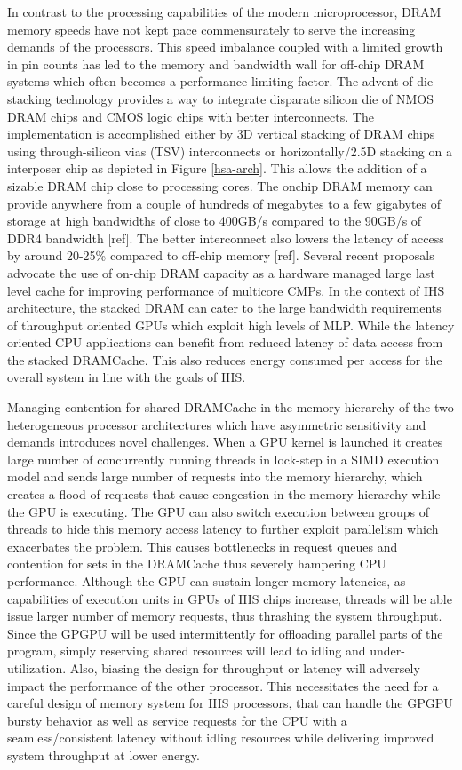 \par In contrast to the processing capabilities of the modern microprocessor, DRAM memory speeds have not kept pace commensurately to serve the increasing demands of the processors. This speed imbalance coupled with a limited growth in pin counts has led to the memory and bandwidth wall \cite{memory-wall,bandwidth-wall} for off-chip DRAM systems which often becomes a performance limiting factor. The advent of die-stacking technology \cite{3d-stacking} provides a way to integrate disparate silicon die of NMOS DRAM chips and CMOS logic chips with better interconnects. The implementation is accomplished either by 3D vertical stacking of DRAM chips using through-silicon vias (TSV) interconnects or horizontally/2.5D stacking on a interposer chip as depicted in Figure \ref{hsa-arch}. This allows the addition of a sizable DRAM chip close to processing cores. The onchip DRAM memory can provide anywhere from a couple of hundreds of megabytes to a few gigabytes of storage at high bandwidths of close to 400GB/s compared to the 90GB/s of DDR4 bandwidth [ref]. The better interconnect also lowers the latency of access by around 20-25\% compared to off-chip memory [ref]. Several recent proposals advocate the use of on-chip DRAM capacity as a hardware managed large last level cache for improving performance of multicore CMPs. In the context of IHS architecture, the stacked DRAM can cater to the large bandwidth requirements of throughput oriented GPUs which exploit high levels of MLP. While the latency oriented CPU applications can benefit from reduced latency of data access from the stacked DRAMCache. This also reduces energy consumed per access for the overall system in line with the goals of IHS.
\par Managing contention for shared DRAMCache in the memory hierarchy of the two heterogeneous processor architectures which have asymmetric sensitivity and demands introduces novel challenges. When a GPU kernel is launched it creates large number of concurrently running threads in lock-step in a SIMD execution model and sends large number of requests into the memory hierarchy, which creates a flood of requests that cause congestion in the memory hierarchy while the GPU is executing. The GPU can also switch execution between groups of threads to hide this memory access latency to further exploit parallelism which exacerbates the problem. This causes bottlenecks in request queues and contention for sets in the DRAMCache thus severely hampering CPU performance. Although the GPU can sustain longer memory latencies, as capabilities of execution units in GPUs of IHS chips increase, threads will be able issue larger number of memory requests, thus thrashing the system throughput. Since the GPGPU will be used intermittently for offloading parallel parts of the program, simply reserving shared resources will lead to idling and under-utilization. Also, biasing the design for throughput or latency will adversely impact the performance of the other processor. This necessitates the need for a careful design of memory system for IHS processors, that can handle the GPGPU bursty behavior as well as service requests for the CPU with a seamless/consistent latency without idling resources while delivering improved system throughput at lower energy.

